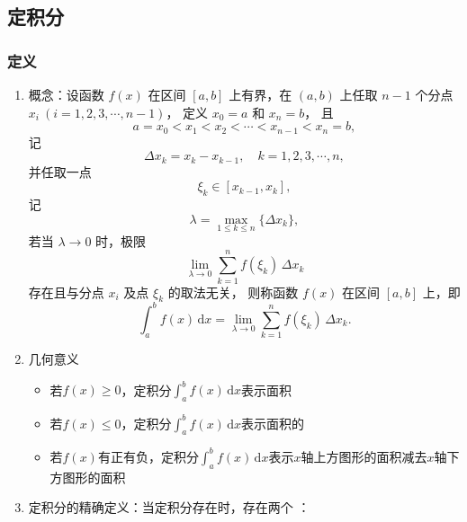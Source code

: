 \documentclass[../book.tex]{subfiles}
\begin{document}
    \subsection{定积分}

    \subsubsection{定义}

    \begin{enumerate}
        \item 概念：设函数 $f(x)$ 在区间 $[a,b]$ 上有界，在 $(a,b)$ 上任取 $n-1$ 个分点
        $x_i \ (i = 1,2,3,\cdots,n-1)$，
        定义 $x_0 = a$ 和 $x_n = b$，
        且
        \[
            a = x_0 < x_1 < x_2 < \cdots < x_{n-1} < x_n = b,
        \]
        记
        \[
            \Delta x_k = x_k - x_{k-1}, \quad k = 1,2,3,\cdots,n,
        \]
        并任取一点
        \[
            \xi_k \in [x_{k-1}, x_k],
        \]
        记
        \[
            \lambda = \max_{1 \leq k \leq n} \{ \Delta x_k \},
        \]
        若当 $\lambda \to 0$ 时，极限
        \[
            \lim_{\lambda \to 0} \sum_{k=1}^{n} f(\xi_k)\,\Delta x_k
        \]
        存在且与分点 $x_i$ 及点 $\xi_k$ 的取法无关，
        则称函数 $f(x)$ 在区间 $[a,b]$ 上{\textbf{\color{red}{可积}}}，即
        \[
            \int_a^b f(x)\,\mathrm{d}x
            =
            \lim_{\lambda \to 0} \sum_{k=1}^{n} f(\xi_k)\,\Delta x_k.
        \]
        \item 几何意义
        \begin{itemize}
            \item 若$f(x) \geq 0$，定积分$\int_a^b f(x)\,\mathrm{d}x$表示面积
            \item 若$f(x) \leq 0$，定积分$\int_a^b f(x)\,\mathrm{d}x$表示面积的{\color{red}{负值}}
            \item 若$f(x)$有正有负，定积分$\int_a^b f(x)\,\mathrm{d}x$表示$x$轴上方图形的面积减去$x$轴下方图形的面积
        \end{itemize}
        \item 定积分的精确定义：当定积分存在时，存在两个 {}：

\end{enumerate}
\end{document}
